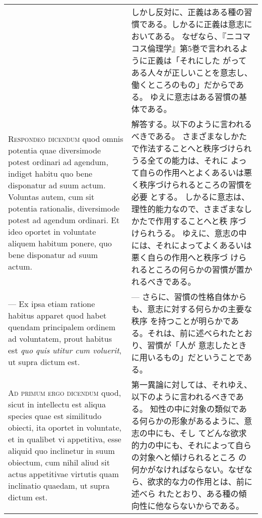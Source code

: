 \documentclass[10pt]{jsarticle} %
\begin{document}
\begin{longtable}{p{21em}p{21em}}
&

しかし反対に、正義はある種の習慣である。しかるに正義は意志においてある。
 なぜなら、『ニコマコス倫理学』第5巻で言われるように正義は「それにした
 がってある人々が正しいことを意志し、働くところのもの」だからである。
 ゆえに意志はある習慣の基体である。

\\



{\scshape Respondeo dicendum} quod omnis potentia quae diversimode potest
 ordinari ad agendum, indiget habitu quo bene disponatur ad suum
 actum. Voluntas autem, cum sit potentia rationalis, diversimode
 potest ad agendum ordinari. 
Et ideo oportet in voluntate aliquem habitum ponere, quo bene
disponatur ad suum actum.

&

解答する。以下のように言われるべきである。
さまざまなしかたで作法することへと秩序づけられうる全ての能力は、それに
 よって自らの作用へとよくあるいは悪く秩序づけられるところの習慣を必要
 とする。
しかるに意志は、理性的能力なので、さまざまなしかたで作用することへと秩
 序づけられうる。
ゆえに、意志の中には、それによってよくあるいは悪く自らの作用へと秩序づ
 けられるところの何らかの習慣が置かれるべきである。

\\


 --- Ex ipsa etiam ratione habitus apparet
quod habet quendam principalem ordinem ad voluntatem, prout habitus
est {\itshape quo quis utitur cum voluerit}, ut supra dictum est.

&

--- さらに、習慣の性格自体からも、意志に対する何らかの主要な秩序
 を持つことが明らかである。それは、前に述べられたとおり、習慣が「人が
 意志したときに用いるもの」だということである。

\\



{\scshape Ad primum ergo dicendum} quod, sicut in intellectu est aliqua species
 quae est similitudo obiecti, ita oportet in voluntate, et in qualibet
 vi appetitiva, esse aliquid quo inclinetur in suum obiectum, cum
 nihil aliud sit actus appetitivae virtutis quam inclinatio quaedam,
 ut supra dictum est. 

&

第一異論に対しては、それゆえ、以下のように言われるべきである。
知性の中に対象の類似である何らかの形象があるように、意志の中にも、そし
 てどんな欲求的力の中にも、それによって自らの対象へと傾けられるところ
 の何かがなければならない。なぜなら、欲求的な力の作用とは、前に述べら
 れたとおり、ある種の傾向性に他ならないからである。


\end{longtable}
\end{document}
